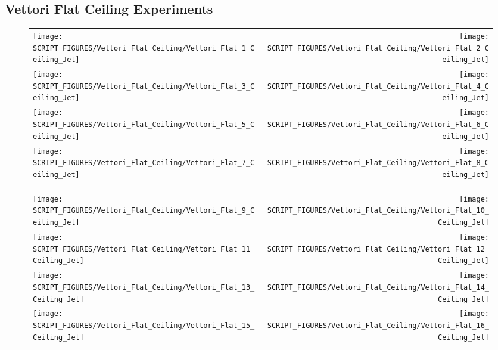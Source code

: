 \clearpage

\subsection{Vettori Flat Ceiling Experiments}

\begin{figure}[!ht]
\begin{tabular*}{\textwidth}{l@{\extracolsep{\fill}}r}
\texttt{[image: SCRIPT\_FIGURES/Vettori\_Flat\_Ceiling/Vettori\_Flat\_1\_Ceiling\_Jet]} &
\texttt{[image: SCRIPT\_FIGURES/Vettori\_Flat\_Ceiling/Vettori\_Flat\_2\_Ceiling\_Jet]} \\
\texttt{[image: SCRIPT\_FIGURES/Vettori\_Flat\_Ceiling/Vettori\_Flat\_3\_Ceiling\_Jet]} &
\texttt{[image: SCRIPT\_FIGURES/Vettori\_Flat\_Ceiling/Vettori\_Flat\_4\_Ceiling\_Jet]} \\
\texttt{[image: SCRIPT\_FIGURES/Vettori\_Flat\_Ceiling/Vettori\_Flat\_5\_Ceiling\_Jet]} &
\texttt{[image: SCRIPT\_FIGURES/Vettori\_Flat\_Ceiling/Vettori\_Flat\_6\_Ceiling\_Jet]} \\
\texttt{[image: SCRIPT\_FIGURES/Vettori\_Flat\_Ceiling/Vettori\_Flat\_7\_Ceiling\_Jet]} &
\texttt{[image: SCRIPT\_FIGURES/Vettori\_Flat\_Ceiling/Vettori\_Flat\_8\_Ceiling\_Jet]}
\end{tabular*}
\end{figure}

\begin{figure}[!ht]
\begin{tabular*}{\textwidth}{l@{\extracolsep{\fill}}r}
\texttt{[image: SCRIPT\_FIGURES/Vettori\_Flat\_Ceiling/Vettori\_Flat\_9\_Ceiling\_Jet]} &
\texttt{[image: SCRIPT\_FIGURES/Vettori\_Flat\_Ceiling/Vettori\_Flat\_10\_Ceiling\_Jet]} \\
\texttt{[image: SCRIPT\_FIGURES/Vettori\_Flat\_Ceiling/Vettori\_Flat\_11\_Ceiling\_Jet]} &
\texttt{[image: SCRIPT\_FIGURES/Vettori\_Flat\_Ceiling/Vettori\_Flat\_12\_Ceiling\_Jet]} \\
\texttt{[image: SCRIPT\_FIGURES/Vettori\_Flat\_Ceiling/Vettori\_Flat\_13\_Ceiling\_Jet]} &
\texttt{[image: SCRIPT\_FIGURES/Vettori\_Flat\_Ceiling/Vettori\_Flat\_14\_Ceiling\_Jet]} \\
\texttt{[image: SCRIPT\_FIGURES/Vettori\_Flat\_Ceiling/Vettori\_Flat\_15\_Ceiling\_Jet]} &
\texttt{[image: SCRIPT\_FIGURES/Vettori\_Flat\_Ceiling/Vettori\_Flat\_16\_Ceiling\_Jet]}
\end{tabular*}
\end{figure}

